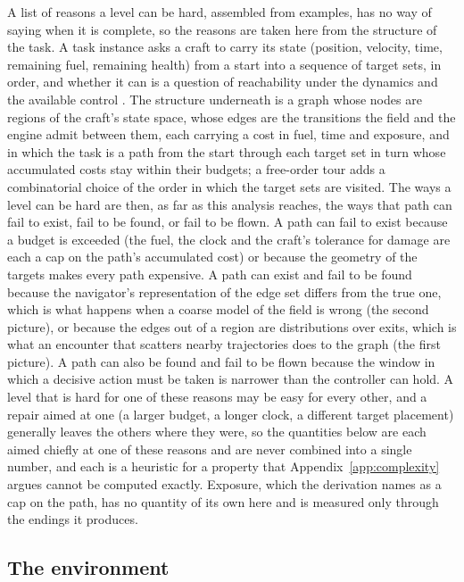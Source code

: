 \documentclass[11pt]{article}
\begin{document}
A list of reasons a level can be hard, assembled from examples, has no way
of saying when it is complete, so the reasons are taken here from the
structure of the task. A task instance asks a craft to carry
its state (position, velocity, time, remaining fuel, remaining health) from
a start into a sequence of target sets, in order, and whether it can is a
question of reachability under the dynamics and the available control
\cite{mitchell2005,lavalle2006}. The structure underneath is a graph whose
nodes are regions of the craft's state space, whose edges are the
transitions the field and the engine admit between them, each carrying a
cost in fuel, time and exposure, and in which the task is a path from the
start through each target set in turn whose accumulated costs stay within
their budgets; a free-order tour adds a combinatorial choice of the order in
which the target sets are visited. The ways a level can be hard are then,
as far as this analysis reaches, the ways that path can fail to exist, fail
to be found, or fail to be flown. A path can fail to exist because a budget
is exceeded (the fuel, the clock and the craft's tolerance for damage are
each a cap on the path's accumulated cost) or because the geometry of the
targets makes every path expensive.
A path can exist and fail to be found because the navigator's
representation of the edge set differs from the true one, which is what
happens when a coarse model of the field is wrong (the second picture), or
because the edges out of a region are distributions over exits, which is
what an encounter that scatters nearby trajectories does to the graph (the
first picture). A path can also be found and fail to be flown because the
window in which a decisive action must be taken is narrower than the
controller can hold. A level that is hard for one of these reasons may be
easy for every other, and a repair aimed at one (a larger budget, a longer
clock, a different target placement) generally leaves the others where they
were, so the quantities below are each aimed chiefly at one of these
reasons and are never combined into a single number, and each is a
heuristic for a property that Appendix~\ref{app:complexity} argues cannot
be computed exactly. Exposure, which the derivation names as a cap on the path, has no
quantity of its own here and is measured only through the endings it
produces.

\subsection{The environment}
\label{sec:env}
\end{document}
